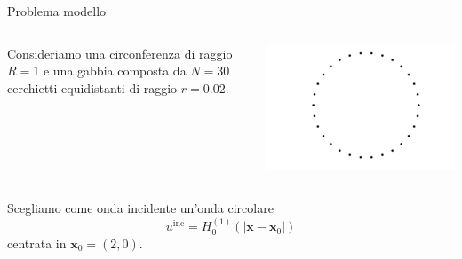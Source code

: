 \documentclass{beamer}
\newcommand{\IR}{{\mathbb R}}
\newcommand{\bx}{{\mathbf x}}
\newcommand{\inc}{{\mathrm{inc}}}
\begin{document}
	\begin{frame}{Problema modello}
			\begin{columns}
			\begin{column}{.6\textwidth}
				Consideriamo una circonferenza di raggio $R=1$ e una gabbia composta da $N=30$ cerchietti equidistanti di raggio $r=0.02$. 
			\end{column}
			\begin{column}{.3\textwidth}
				\includegraphics[width=\textwidth]{figs/wire.png}
			\end{column}
		\end{columns}
		Scegliamo come onda incidente un'onda circolare $$u^\inc = H_0^{(1)}(|\bx - \bx_0|)$$ centrata in $\bx_0=(2,0)$.
	\end{frame}
	
\end{document}
